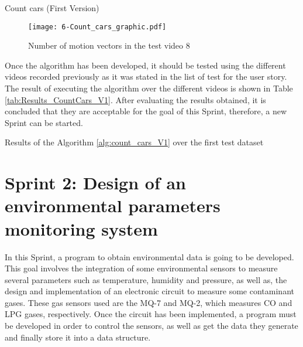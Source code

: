 \begin{algorithm}
{{{			}
		}	
	}
	\caption{Count cars (First Version)}\label{alg:count_cars_V1}
\end{algorithm}\DecMargin{1em}

\begin{figure}[!h]
	\begin{center}
		\texttt{[image: 6-Count\_cars\_graphic.pdf]}
		\caption{Number of motion vectors in the test video 8}
		\label{fig:6-Count_cars_graphic}
	\end{center}
\end{figure}

Once the algorithm has been developed, it should be tested using the different videos recorded previously as it was stated in the list of test for the user story. The result of executing the algorithm over the different videos is shown in Table \ref{tab:Results_CountCars_V1}. After evaluating the results obtained, it is concluded that they are acceptable for the goal of this Sprint, therefore, a new Sprint can be started.

\begin{table}[hp]
	\centering
	{\small
		
	}
	\caption{Results of the Algorithm \ref{alg:count_cars_V1} over the first test dataset}
	\label{tab:Results_CountCars_V1}
\end{table}





\section{Sprint 2: Design of an environmental parameters monitoring system}
In this Sprint, a program to obtain environmental data is going to be developed. This goal involves the integration of some environmental sensors to measure several parameters such as temperature, humidity and pressure, as well as, the design and implementation of an electronic circuit to measure some contaminant gases. These gas sensors used are the MQ-7 and MQ-2, which measures CO and LPG gases, respectively. Once the circuit has been implemented, a program must be developed in order to control the sensors, as well as get the data they generate and finally store it into a data structure.

